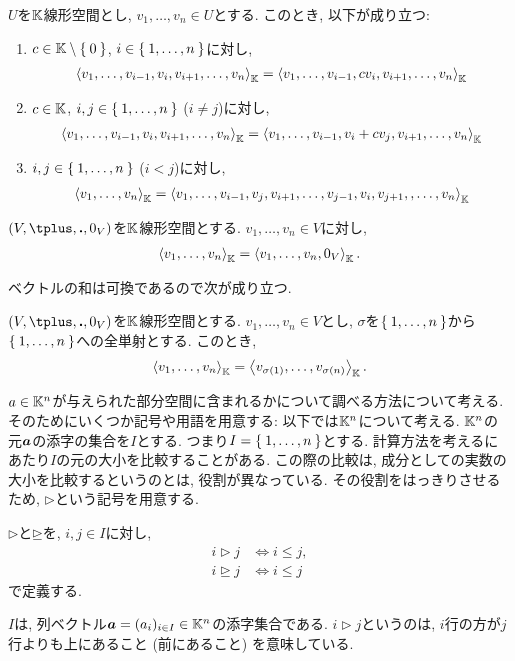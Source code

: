 \begin{lemma}
  $U$を$\mathbb{K}$線形空間とし,
  $v_1,\ldots,v_n\in U$とする.
  このとき, 以下が成り立つ:
  \begin{enumerate}
  \item
    $c\in \mathbb{K}\setminus\Set{0}$, $i\in\Set{1,\ldots,n}$に対し,
    \begin{align*}
      \Braket{v_1,\ldots,v_{i-1},v_{i},v_{i+1},\ldots,v_n}_{\mathbb{K}}=
      \Braket{v_1,\ldots,v_{i-1},cv_{i},v_{i+1},\ldots,v_n}_{\mathbb{K}}
    \end{align*}
  \item
    $c\in \mathbb{K}$, $i,j\in\Set{1,\ldots,n}$ ($i\neq j$)に対し,
    \begin{align*}
      \Braket{v_1,\ldots,v_{i-1},v_{i},v_{i+1},\ldots,v_n}_{\mathbb{K}}=
      \Braket{v_1,\ldots,v_{i-1},v_i+cv_{j},v_{i+1},\ldots,v_n}_{\mathbb{K}}
    \end{align*}
  \item
    $i,j\in\Set{1,\ldots,n}$ ($i< j$)に対し,
    \begin{align*}
      \Braket{v_1,\ldots,v_n}_{\mathbb{K}}=
      \Braket{v_1,\ldots,v_{i-1},v_j,v_{i+1},\ldots,v_{j-1},v_i,v_{j+1},,\ldots,v_n}_{\mathbb{K}}
    \end{align*}
  \end{enumerate}
\end{lemma}

\begin{lemma}
  $(V,\plus,\act,0_V)$を$\mathbb{K}$線形空間とする.
  $v_1,\ldots,v_n\in V$に対し,
    \begin{align*}
      \Braket{v_1,\ldots,v_n}_{\mathbb{K}}=
      \Braket{v_1,\ldots,v_n,0_V}_{\mathbb{K}}.
    \end{align*}
\end{lemma}

ベクトルの和は可換であるので次が成り立つ.
\begin{lemma}
  $(V,\plus,\act,0_V)$を$\mathbb{K}$線形空間とする.
  $v_1,\ldots,v_n\in V$とし,
  $\sigma$を$\Set{1,\ldots,n}$から$\Set{1,\ldots,n}$への全単射とする.
  このとき,
    \begin{align*}
      \Braket{v_1,\ldots,v_n}_{\mathbb{K}}=
      \Braket{v_{\sigma(1)},\ldots,v_{\sigma(n)}}_{\mathbb{K}}.
    \end{align*}
\end{lemma}


$a\in\mathbb{K}^n$が与えられた部分空間に含まれるかについて調べる方法について考える.
そのためにいくつか記号や用語を用意する:
以下では$\mathbb{K}^n$について考える.
$\mathbb{K}^n$の元$\boldsymbol{a}$の添字の集合を$I$とする.
つまり$I=\Set{1,\ldots,n}$とする.
計算方法を考えるにあたり$I$の元の大小を比較することがある.
この際の比較は, 成分としての実数の大小を比較するというのとは,
役割が異なっている.
その役割をはっきりさせるため, $\rhd$という記号を用意する.
\begin{definition}
  $\rhd$と$\unrhd$を,
  $i,j\in I$に対し,
  \begin{align*}
    i\rhd j &\iff i \leq j,\\
    i\unrhd j &\iff i \leq j
  \end{align*}
  で定義する.
\end{definition}
$I$は, 列ベクトル$\boldsymbol{a}=(a_i)_{i\in I} \in \mathbb{K}^n$の添字集合である.
$i\rhd j$というのは,
$i$行の方が$j$行よりも上にあること (前にあること) を意味している.

